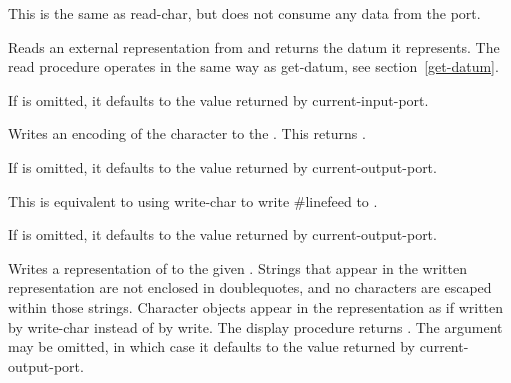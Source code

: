 \begin{entry}{%
}
   
This is the same as {\cf read-char}, but does not consume any data
from the port.
\end{entry}

\begin{entry}{%
}

Reads an external representation from 
and returns the datum it
represents.  The {\cf read} procedure operates in the same way as 
{\cf get-datum}, see section~\ref{get-datum}.

If  is omitted, it defaults to the value returned by
{\cf current-input-port}.
\end{entry}

\begin{entry}{%
}

Writes an encoding of the character  to the
.  This returns \unspecifiedreturn.

If  is omitted, it defaults to the value returned by
{\cf current-output-port}.
\end{entry}

\begin{entry}{%
}

This is equivalent to using {\cf write-char} to write
{\cf \#\backwhack{}linefeed}
to .

If  is omitted, it defaults to the value returned by
{\cf current-output-port}.
\end{entry}

\begin{entry}{%
}

Writes a representation of  to the given .
Strings that appear in
the written representation are not enclosed in doublequotes, and no
characters are escaped within those strings.  Character objects appear
in the representation as if written by {\cf write-char} instead of by
{\cf write}.  The {\cf display} procedure returns \unspecifiedreturn.  The
 argument may be omitted, in which case it defaults
to the value returned by {\cf current-output-port}.
\end{entry}

